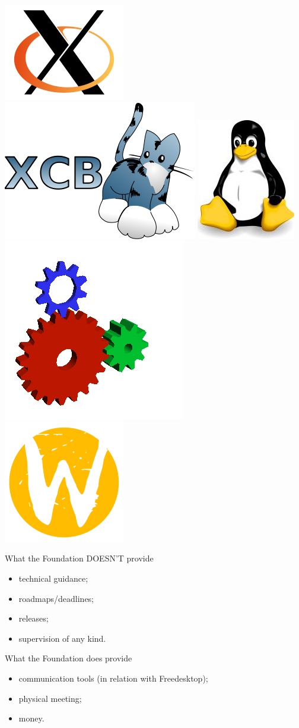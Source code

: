 \documentclass{beamer}
\begin{document}
\begin{frame}
			\begin{center}
				\includegraphics[width=.15\linewidth]{figures/logo_small_200px.png}
				\hspace{.05\linewidth}
				\includegraphics[width=.15\linewidth]{figures/xcb_logo_small.png}
				\hspace{.05\linewidth}
				\includegraphics[width=.15\linewidth]{figures/tux_small.jpg}
				\hspace{.05\linewidth}
				\includegraphics[width=.15\linewidth]{figures/glxgears-trans.png}
				\hspace{.05\linewidth}
				\includegraphics[width=.15\linewidth]{figures/wayland_logo_small.png}
			\end{center}

		\end{frame}

		\begin{frame}
			\begin{block}{What the Foundation DOESN'T provide}
				\begin{itemize}
					\item technical guidance;
					\item roadmaps/deadlines;
					\item releases;
					\item supervision of any kind.
				\end{itemize}
			\end{block}
			
			\begin{block}{What the Foundation does provide}
				\begin{itemize}
					\item communication tools (in relation with Freedesktop);
					\item physical meeting;
					\item money.
				\end{itemize}
			\end{block}
		\end{frame}
\end{document}
